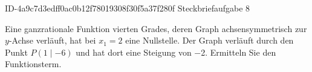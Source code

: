 \begin{exercise}
      {ID-4a9c7d3edff0ac0b12f78019308f30f5a37f280f}
      {Steckbriefaufgabe 8}
  \ifproblem\problem\par
    Eine ganzrationale Funktion vierten Grades, deren Graph
    achsensymmetrisch zur $y$-Achse verläuft, hat bei
    $x_1=\num{2}$ eine Nullstelle. Der Graph verläuft durch
    den Punkt $P(\num{1}\mid\num{-6})$ und hat dort eine
    Steigung von \num{-2}. Ermitteln Sie den Funktionsterm.
  \fi
\end{exercise}
